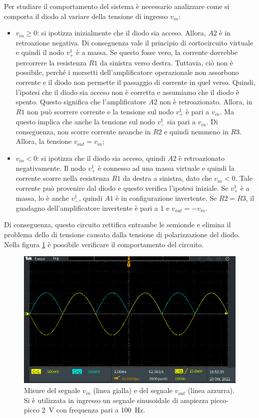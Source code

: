 \noindent
Per studiare il comportamento del sistema è necessario analizzare come si comporta il diodo al variare della tensione di ingresso $v_{in}$:
\begin{itemize}
	\item $v_{in} \geq 0$: si ipotizza inizialmente che il diodo sia acceso. Allora, $A2$  è in retroazione negativa. Di conseguenza vale il principio di cortocircuito virtuale e quindi il nodo $v_{+}^1$ è a massa. Se questo fosse vero, la corrente dovrebbe percorrere la resistenza $R1$ da sinistra verso destra. Tuttavia, ciò non è possibile, perché i morsetti dell'amplificatore operazionale non assorbono corrente e il diodo non permette il passaggio di corrente in quel verso. Quindi, l'ipotesi che il diodo sia acceso non è corretta e assumiamo che il diodo è spento. Questo significa che l'amplificatore $A2$ non è retroazionato. Allora, in $R1$ non può scorrere corrente e la tensione sul nodo $v_{+}^1$ è pari a $v_{in}$. Ma questo implica che anche la tensione sul nodo $v_{-}^1$ sia pari a $v_{in}$. Di conseguenza, non scorre corrente neanche in $R2$ e quindi nemmeno in $R3$. Allora, la tensione $v_{out} = v_{in}$;
	\item $v_{in} < 0$: si ipotizza che il diodo sia acceso, quindi $A2$ è retroazionato negativamente. Il nodo $v_{+}^1$ è connesso ad una massa virtuale e quindi la corrente scorre nella resistenza $R1$ da destra a sinistra, dato che $v_{in} < 0$. Tale corrente può provenire dal diodo e questo verifica l'ipotesi iniziale. Se $v_{+}^1$ è a massa, lo è anche $v_{-}^1$, quindi $A1$ è in configurazione invertente. Se $R2 = R3$, il guadagno dell'amplificatore invertente è pari a 1 e $v_{out} = -v_{in}$.
\end{itemize}
Di conseguenza, questo circuito rettifica entrambe le semionde e elimina il problema dello  di tensione causato dalla tensione di polarizzazione del diodo. Nella figura \ref{fig:uscita_circuito_1} è possibile verificare il comportamento del circuito.
\begin{figure}[tbh]
	\centering
	\includegraphics[width=\linewidth]{./ImageFiles/Laboratorio 3/TEK00001.PNG}
	\caption{Misure del segnale $v_{in}$ (linea gialla) e del segnale $v_{out}$ (linea azzurra). Si è utilizzata in ingresso un segnale sinusoidale di ampiezza picco-picco \SI{2}{\volt} con frequenza pari a \SI{100}{\hertz}.}
	\label{fig:uscita_circuito_1}
\end{figure}
